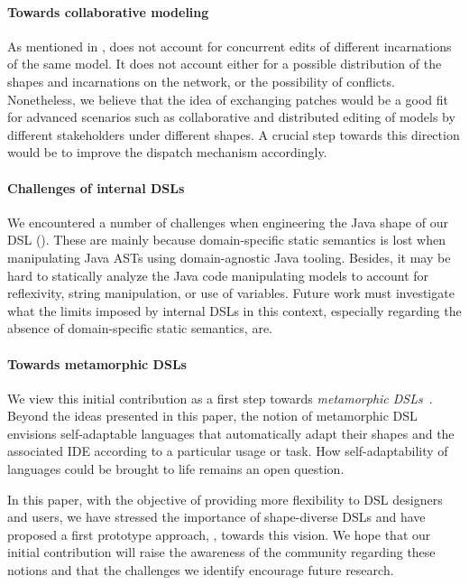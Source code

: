 \paragraph{Towards collaborative modeling}
As mentioned in , \prism does not account for concurrent edits of different incarnations of the same model.
It does not account either for a possible distribution of the shapes and incarnations on the network, or the possibility of conflicts.
Nonetheless, we believe that the idea of exchanging patches would be a good fit for advanced scenarios such as collaborative and distributed editing of models by different stakeholders under different shapes.
A crucial step towards this direction would be to improve the dispatch mechanism accordingly.

\paragraph{Challenges of internal DSLs}
We encountered a number of challenges when engineering the Java shape of our DSL ().
These are mainly because domain-specific static semantics is lost when manipulating Java ASTs using domain-agnostic Java tooling.
Besides, it may be hard to statically analyze the Java code manipulating models to account for reflexivity, string manipulation, or use of variables.
Future work must investigate what the limits imposed by internal DSLs in this context, especially regarding the absence of domain-specific static semantics, are.


\paragraph{Towards metamorphic DSLs}
We view this initial contribution as a first step towards \emph{metamorphic DSLs}~\cite{acher2014metamorphic}.
Beyond the ideas presented in this paper, the notion of metamorphic DSL envisions self-adaptable languages that automatically adapt their shapes and the associated IDE according to a particular usage or task.
How self-adaptability of languages could be brought to life remains an open question.

\vspace{1em}
In this paper, with the objective of providing more flexibility to DSL designers and users, we have stressed the importance of shape-diverse DSLs and have proposed a first prototype approach, \prism, towards this vision.
We hope that our initial contribution will raise the awareness of the community regarding these notions and that the challenges we identify encourage future research.
